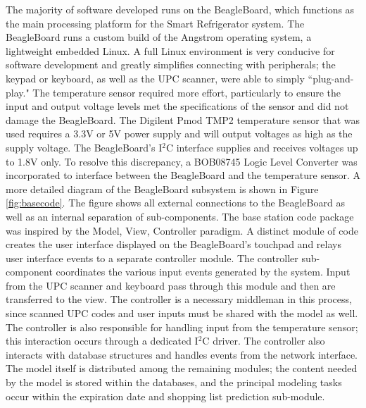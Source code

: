 \documentclass[11pt]{article} %
\begin{document}
The majority of software developed runs on the BeagleBoard, which functions as the main processing platform for the Smart Refrigerator system. The BeagleBoard runs a custom build of the Angstrom operating system, a lightweight embedded Linux. A full Linux environment is very conducive for software development and greatly simplifies connecting with peripherals; the keypad or keyboard, as well as the UPC scanner, were able to simply ``plug-and-play." The temperature sensor required more effort, particularly to ensure the input and output voltage levels met the specifications of the sensor and did not damage the BeagleBoard. The Digilent Pmod TMP2 temperature sensor that was used requires a 3.3V or 5V power supply and will output voltages as high as the supply voltage. The BeagleBoard's I$^2$C interface supplies and receives voltages up to 1.8V only. To resolve this discrepancy, a BOB08745 Logic Level Converter was incorporated to interface between the BeagleBoard and the temperature sensor.
\newline \indent \newline
A more detailed diagram of the BeagleBoard subsystem is shown in Figure \ref{fig:basecode}. The figure shows all external connections to the BeagleBoard as well as an internal separation of sub-components. The base station code package was inspired by the Model, View, Controller paradigm. A distinct module of code creates the user interface displayed on the BeagleBoard's touchpad and relays user interface events to a separate controller module. The controller sub-component coordinates the various input events generated by the system. Input from the UPC scanner and keyboard pass through this module and then are transferred to the view. The controller is a necessary middleman in this process, since scanned UPC codes and user inputs must be shared with the model as well. The controller is also responsible for handling input from the temperature sensor; this interaction occurs through a dedicated I$^2$C driver. The controller also interacts with database structures and handles events from the network interface. The model itself is distributed among the remaining modules; the content needed by the model is stored within the databases, and the principal modeling tasks occur within the expiration date and shopping list prediction sub-module.
\end{document}
